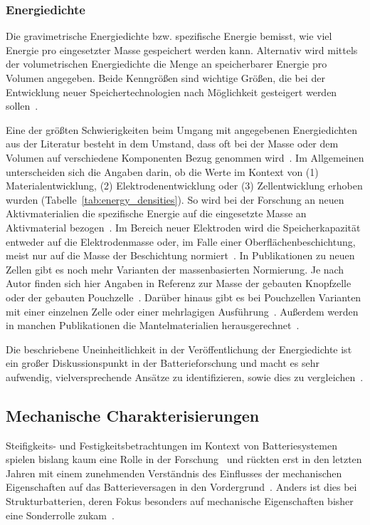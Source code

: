 \subsubsection*{Energiedichte}
Die gravimetrische Energiedichte bzw. spezifische Energie bemisst, wie viel Energie pro eingesetzter Masse gespeichert werden kann. Alternativ wird mittels der volumetrischen Energiedichte die Menge an speicherbarer Energie pro Volumen angegeben. Beide Kenngrößen sind wichtige Größen, die bei der Entwicklung neuer Speichertechnologien nach Möglichkeit gesteigert werden sollen~\cite{Plett2015}.

Eine der größten Schwierigkeiten beim Umgang mit angegebenen Energiedichten aus der Literatur besteht in dem Umstand, dass oft bei der Masse oder dem Volumen auf verschiedene Komponenten Bezug genommen wird~\cite{Son2021}. Im Allgemeinen unterscheiden sich die Angaben darin, ob die Werte im Kontext von (1) Materialentwicklung, (2) Elektrodenentwicklung oder (3) Zellentwicklung
erhoben wurden (Tabelle~\ref{tab:energy_densities}).
So wird bei der Forschung an neuen Aktivmaterialien die spezifische Energie auf die eingesetzte Masse an Aktivmaterial bezogen~\cite{Son2021}. Im Bereich neuer Elektroden wird die Speicherkapazität entweder auf die Elektrodenmasse oder, im Falle einer Oberflächenbeschichtung, meist nur auf die Masse der Beschichtung normiert~\cite{Greenhalgh2023}. In Publikationen zu neuen Zellen gibt es noch mehr Varianten der massenbasierten Normierung. Je nach Autor finden sich hier Angaben in Referenz zur Masse der gebauten Knopfzelle oder der gebauten Pouchzelle~\cite{Akimoto1998,Liu2018}. Darüber hinaus gibt es bei Pouchzellen Varianten mit einer einzelnen Zelle oder einer mehrlagigen Ausführung~\cite{Schmuch2018}. Außerdem werden in manchen Publikationen die Mantelmaterialien herausgerechnet~\cite{Greenhalgh2023}.

Die beschriebene Uneinheitlichkeit in der Veröffentlichung der Energiedichte ist ein großer Diskussionspunkt in der Batterieforschung und macht es sehr aufwendig, vielversprechende Ansätze zu identifizieren, sowie dies zu vergleichen~\cite{Greenhalgh2023, Zschiebsch2024}.

\subsection{Mechanische Charakterisierungen}
Steifigkeits- und Festigkeitsbetrachtungen im Kontext von Batteriesystemen spielen bislang kaum eine Rolle in der Forschung~\cite{Chen2024a} und rückten erst in den letzten Jahren mit einem zunehmenden Verständnis des Einflusses der mechanischen Eigenschaften auf das Batterieversagen in den Vordergrund~\cite{Zhu2023}. Anders ist dies bei Strukturbatterien, deren Fokus besonders auf mechanische Eigenschaften bisher eine Sonderrolle zukam~\cite{Asp2021}.

